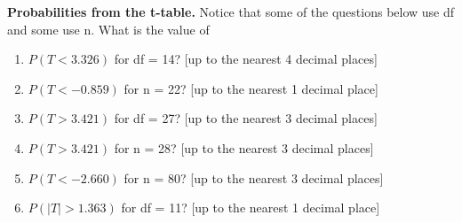 \item \textbf{Probabilities from the t-table.} Notice that some of the questions below use df and some use n.  What is the value of 
    \begin{enumerate}
     \item  $P(T < 3.326)$ for df = 14?  [up to the nearest 4 decimal places]\ \ \ %
     \item  $P(T < -0.859)$ for n = 22? [up to the nearest 1 decimal place]\ \ \ %
     \item  $P(T > 3.421)$ for df = 27?  [up to the nearest 3 decimal places]\ \ \ %
     \item  $P(T > 3.421)$ for n = 28?  [up to the nearest 3 decimal places]\ \ \ %
     \item  $P(T < -2.660)$ for n = 80?   [up to the nearest 3 decimal places]\ \ \ %
     \item  $P(|T| > 1.363)$ for df = 11?   [up to the nearest 1 decimal place]\ \ \ %
    \end{enumerate}

